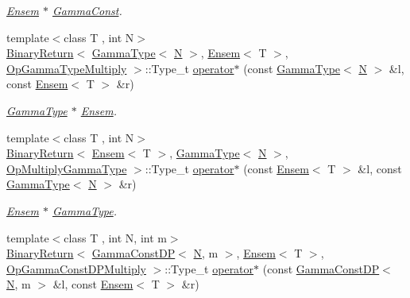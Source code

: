 \begin{DoxyCompactItemize}
\begin{DoxyCompactList}\small\item\em \mbox{\hyperlink{classENSEM_1_1Ensem}{Ensem}} $\ast$ \mbox{\hyperlink{classENSEM_1_1GammaConst}{Gamma\+Const}}. \end{DoxyCompactList}\item 
{\footnotesize template$<$class T , int N$>$ }\\\mbox{\hyperlink{structENSEM_1_1BinaryReturn}{Binary\+Return}}$<$ \mbox{\hyperlink{classENSEM_1_1GammaType}{Gamma\+Type}}$<$ \mbox{\hyperlink{operator__name__util_8cc_a7722c8ecbb62d99aee7ce68b1752f337}{N}} $>$, \mbox{\hyperlink{classENSEM_1_1Ensem}{Ensem}}$<$ T $>$, \mbox{\hyperlink{structENSEM_1_1OpGammaTypeMultiply}{Op\+Gamma\+Type\+Multiply}} $>$\+::Type\+\_\+t \mbox{\hyperlink{group__eensem_ga399b896691f2d528edcade561c6e571d}{operator$\ast$}} (const \mbox{\hyperlink{classENSEM_1_1GammaType}{Gamma\+Type}}$<$ \mbox{\hyperlink{operator__name__util_8cc_a7722c8ecbb62d99aee7ce68b1752f337}{N}} $>$ \&l, const \mbox{\hyperlink{classENSEM_1_1Ensem}{Ensem}}$<$ T $>$ \&r)
\begin{DoxyCompactList}\small\item\em \mbox{\hyperlink{classENSEM_1_1GammaType}{Gamma\+Type}} $\ast$ \mbox{\hyperlink{classENSEM_1_1Ensem}{Ensem}}. \end{DoxyCompactList}\item 
{\footnotesize template$<$class T , int N$>$ }\\\mbox{\hyperlink{structENSEM_1_1BinaryReturn}{Binary\+Return}}$<$ \mbox{\hyperlink{classENSEM_1_1Ensem}{Ensem}}$<$ T $>$, \mbox{\hyperlink{classENSEM_1_1GammaType}{Gamma\+Type}}$<$ \mbox{\hyperlink{operator__name__util_8cc_a7722c8ecbb62d99aee7ce68b1752f337}{N}} $>$, \mbox{\hyperlink{structENSEM_1_1OpMultiplyGammaType}{Op\+Multiply\+Gamma\+Type}} $>$\+::Type\+\_\+t \mbox{\hyperlink{group__eensem_ga5a4ddba3b396c11e474246b57940a2cc}{operator$\ast$}} (const \mbox{\hyperlink{classENSEM_1_1Ensem}{Ensem}}$<$ T $>$ \&l, const \mbox{\hyperlink{classENSEM_1_1GammaType}{Gamma\+Type}}$<$ \mbox{\hyperlink{operator__name__util_8cc_a7722c8ecbb62d99aee7ce68b1752f337}{N}} $>$ \&r)
\begin{DoxyCompactList}\small\item\em \mbox{\hyperlink{classENSEM_1_1Ensem}{Ensem}} $\ast$ \mbox{\hyperlink{classENSEM_1_1GammaType}{Gamma\+Type}}. \end{DoxyCompactList}\item 
{\footnotesize template$<$class T , int N, int m$>$ }\\\mbox{\hyperlink{structENSEM_1_1BinaryReturn}{Binary\+Return}}$<$ \mbox{\hyperlink{classENSEM_1_1GammaConstDP}{Gamma\+Const\+DP}}$<$ \mbox{\hyperlink{operator__name__util_8cc_a7722c8ecbb62d99aee7ce68b1752f337}{N}}, m $>$, \mbox{\hyperlink{classENSEM_1_1Ensem}{Ensem}}$<$ T $>$, \mbox{\hyperlink{structENSEM_1_1OpGammaConstDPMultiply}{Op\+Gamma\+Const\+D\+P\+Multiply}} $>$\+::Type\+\_\+t \mbox{\hyperlink{group__eensem_ga60f93a7eee86e9559faa6e162cf9b9a1}{operator$\ast$}} (const \mbox{\hyperlink{classENSEM_1_1GammaConstDP}{Gamma\+Const\+DP}}$<$ \mbox{\hyperlink{operator__name__util_8cc_a7722c8ecbb62d99aee7ce68b1752f337}{N}}, m $>$ \&l, const \mbox{\hyperlink{classENSEM_1_1Ensem}{Ensem}}$<$ T $>$ \&r)

\end{DoxyCompactItemize}
